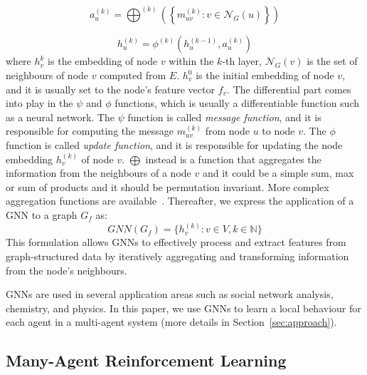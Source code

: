 \begin{equation}
a^{(k)}_u = \bigoplus^{(k)}\left(\left\{m^{(k)}_{uv}: v \in \mathcal{N}_G(u)\right\}\right)
\end{equation}

\begin{equation}
h_u^{(k)} = \phi^{(k)}\left(h_u^{(k-1)}, a^{(k)}_u\right)
\end{equation}
where $h_{v}^{k}$ is the embedding of node $v$ within the $k$-th layer, 
 $\mathcal{N}_G(v)$ is the set of neighbours of node $v$ computed from $E$.
%
$h_v^0$ is the initial embedding of node $v$, and it is usually set to the node's feature vector $f_v$.
%
The differential part comes into play in the $\psi$ and $\phi$ functions, 
 which is usually a differentiable function such as a neural network.
%
The $\psi$ function is called \emph{message function}, and it is responsible for computing the message $m_{uv}^{(k)}$ from node $u$ to node $v$.
The $\phi$ function is called \emph{update function}, and it is responsible for updating the node embedding $h_v^{(k)}$ of node $v$.
$\bigoplus $ instead is a function that aggregates the information from the neighbours of a node $v$
 and it could be a simple sum, max or sum of products and it should be permutation invariant. 
 More complex aggregation functions are available~\cite{pellegrini2020learning}.
%
Thereafter, we express the application of a \ac{GNN} to a graph $G_f$ as:
\begin{equation}
\mathit{GNN}(G_f) = \{h_v^{(k)}: v \in V, k \in \mathbb{N}\}
\end{equation} 
This formulation allows \acp{GNN} to effectively process and extract features from graph-structured data by iteratively aggregating and transforming information from the node's neighbours.

\acp{GNN} are used in several application areas such as social network analysis, chemistry, and physics.
 In this paper, we use \acp{GNN} to learn a local behaviour for each agent in a multi-agent system (more details in Section~\ref{sec:approach}).
\subsection{Many-Agent Reinforcement Learning}

